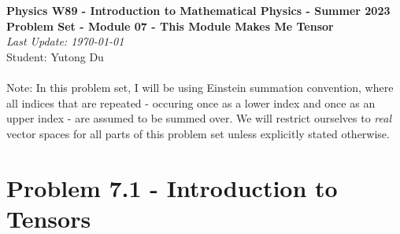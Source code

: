 \documentclass{article}
\begin{document}
\addcopyright
\begin{center}
{\bf \large Physics W89 - Introduction to Mathematical Physics - Summer 2023}\\\medskip
{\bf \large Problem Set - Module 07 - This Module Makes Me Tensor} \\\medskip
{\emph{Last Update: \today}\\}
{Student: Yutong Du}
\end{center}

\dphline
\paragraph{}
Note: In this problem set, I will be using Einstein summation convention, where all indices that are repeated - occuring once as a lower index and once as an upper index - 
are assumed to be summed over.  We will restrict ourselves to \emph{real} vector spaces for all parts of this problem set unless explicitly stated otherwise.

\dphline
\bigskip
\section*{Problem 7.1 - Introduction to Tensors}
\end{document}
